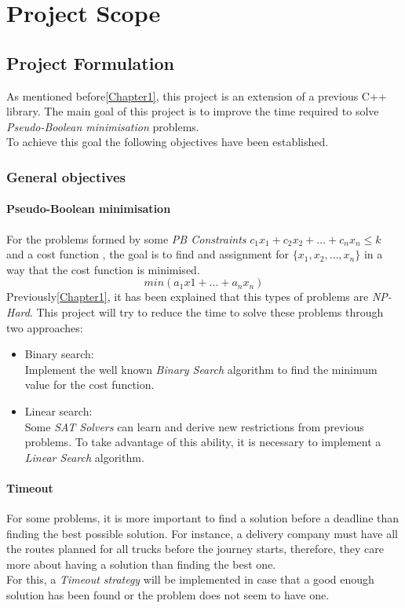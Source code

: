 \chapter{Project Scope}
\label{Chapter2}

\section{Project Formulation}

As mentioned before\ref{Chapter1}, this project is an extension of a previous C++ library. The main goal of this project is to improve the time required to solve \emph{Pseudo-Boolean minimisation} problems. \\
To achieve this goal the following objectives have been established. 

\subsection{General objectives}

\subsubsection{Pseudo-Boolean minimisation}
For the problems formed by some \emph{PB Constraints} $c_{1}x_{1}+c_{2}x_{2}+\ldots +c_{n}x_{n} \leq k$ and a cost function , the goal is to find and assignment for $\{x_{1},x_{2},\ldots,x_{n}\}$ in a way that the cost function is minimised. $$min(a_{1}x{1} + ... + a_{n}x_{n})$$
Previously\ref{Chapter1}, it has been explained that this types of problems are \emph{NP-Hard}. This project will try to reduce the time to solve these problems through two approaches:
\begin{itemize}
	\item Binary search:\\
	Implement the well known \emph{Binary Search} algorithm to find the minimum value for the cost function.	
	\item Linear search:\\
	Some \emph{SAT Solvers} can learn and derive new restrictions from previous problems. To take advantage of this ability, it is necessary to implement a \emph{Linear Search} algorithm.
\end{itemize}

\subsubsection{Timeout}
For some problems, it is more important to find a solution before a deadline than finding the best possible solution. For instance, a delivery company must have all the routes planned for all trucks before the journey starts, therefore, they care more about having a solution than finding the best one.\\
For this, a \emph{Timeout strategy} will be implemented in case that a good enough solution has been found or the problem does not seem to have one. 
